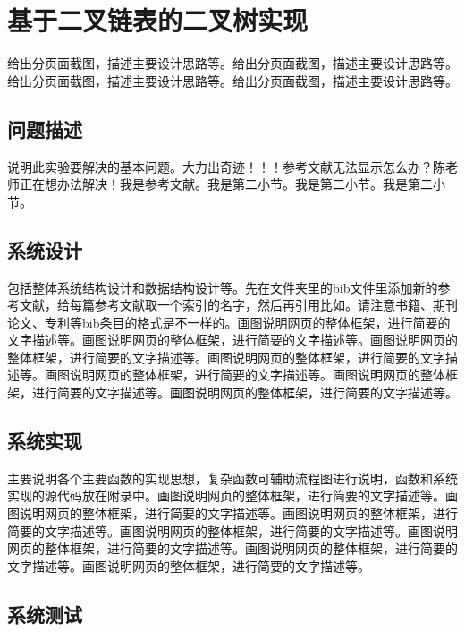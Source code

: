 \documentclass[supercite]{Experimental_Report}
\theoremstyle{definition}
\begin{document}
\section{基于二叉链表的二叉树实现}

给出分页面截图，描述主要设计思路等。给出分页面截图，描述主要设计思路等。给出分页面截图，描述主要设计思路等。给出分页面截图，描述主要设计思路等。

\subsection{问题描述}

说明此实验要解决的基本问题。大力出奇迹！！！参考文献无法显示怎么办？陈老师正在想办法解决\cite{STR2021Neurocom, AVS2021Neurocom}！我是参考文献。我是第二小节\cite{Mehrabian1974An}。我是第二小节\cite{Rezaei2014CVPR}。我是第二小节\cite{Ramnath2008IJCV}。

\subsection{系统设计}

包括整体系统结构设计和数据结构设计等。先在文件夹里的bib文件里添加新的参考文献，给每篇参考文献取一个索引的名字，然后再引用比如\cite{STR2021Neurocom}\cite{AVS2021Neurocom, Rezaei2014CVPR}。请注意书籍、期刊论文、专利等bib条目的格式是不一样的。画图说明网页的整体框架，进行简要的文字描述等。画图说明网页的整体框架，进行简要的文字描述等。画图说明网页的整体框架，进行简要的文字描述等。画图说明网页的整体框架，进行简要的文字描述等。画图说明网页的整体框架，进行简要的文字描述等。画图说明网页的整体框架，进行简要的文字描述等。画图说明网页的整体框架，进行简要的文字描述等。

\subsection{系统实现}

主要说明各个主要函数的实现思想，复杂函数可辅助流程图进行说明，函数和系统实现的源代码放在附录中。画图说明网页的整体框架，进行简要的文字描述等。画图说明网页的整体框架，进行简要的文字描述等。画图说明网页的整体框架，进行简要的文字描述等。画图说明网页的整体框架，进行简要的文字描述等。画图说明网页的整体框架，进行简要的文字描述等。画图说明网页的整体框架，进行简要的文字描述等。画图说明网页的整体框架，进行简要的文字描述等。

\subsection{系统测试}
\end{document}
